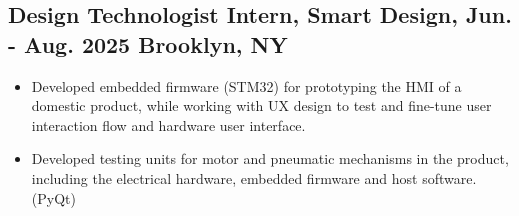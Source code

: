 \documentclass[12pt]{article}
\begin{document}
    \subsection*{Design Technologist Intern, Smart Design, Jun. - Aug. 2025 \hfill Brooklyn, NY}
    {\small
    \begin{itemize}
        \item Developed embedded firmware (STM32) for prototyping the HMI of a domestic product, while working with UX design to test and fine-tune user interaction flow and hardware user interface.
        \item Developed testing units for motor and pneumatic mechanisms in the product, including the electrical hardware, embedded firmware and host software. (PyQt)
    \end{itemize}
    }
\end{document}
